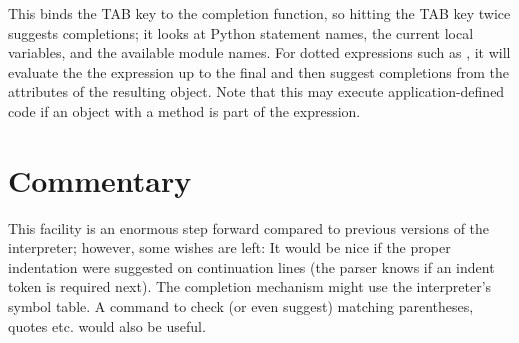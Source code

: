 \documentclass{manual}
\begin{document}
This binds the TAB key to the completion function, so hitting the TAB
key twice suggests completions; it looks at Python statement names,
the current local variables, and the available module names.  For
dotted expressions such as , it will evaluate the the
expression up to the final  and then suggest completions
from the attributes of the resulting object.  Note that this may
execute application-defined code if an object with a
 method is part of the expression.


\section{Commentary \label{commentary}}

This facility is an enormous step forward compared to previous
versions of the interpreter; however, some wishes are left: It would
be nice if the proper indentation were suggested on continuation lines
(the parser knows if an indent token is required next).  The
completion mechanism might use the interpreter's symbol table.  A
command to check (or even suggest) matching parentheses, quotes etc.
would also be useful.

\end{document}
